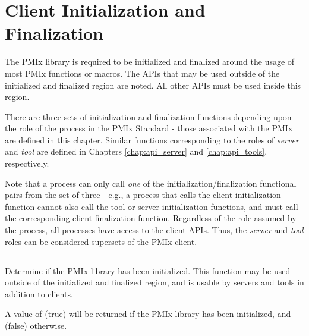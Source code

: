 \chapter{Client Initialization and Finalization}
\label{chap:api_init}

The \ac{PMIx} library is required to be initialized and finalized around the usage of most \ac{PMIx} functions or macros.
The \acp{API} that may be used outside of the initialized and finalized region are noted.
All other \acp{API} must be used inside this region.

There are three sets of initialization and finalization functions depending upon the role of the process in the \ac{PMIx} Standard - those associated with the \ac{PMIx}  are defined in this chapter. Similar functions corresponding to the roles of \emph{server} and \emph{tool} are defined in Chapters \ref{chap:api_server} and \ref{chap:api_tools}, respectively.

Note that a process can only call \textit{one} of the initialization/finalization functional pairs from the set of three - e.g., a process that calls the client initialization function cannot also call the tool or server initialization functions, and must call the corresponding client finalization function. Regardless of the role assumed by the process, all processes have access to the client \acp{API}. Thus, the \emph{server} and \emph{tool} roles can be considered supersets of the \ac{PMIx} client.

\section{}

\summary

Determine if the \ac{PMIx} library has been initialized. This function may be used outside of the initialized and finalized region, and is usable by servers and tools in addition to clients.

\format


A value of  (true) will be returned if the \ac{PMIx} library has been initialized, and  (false) otherwise.

